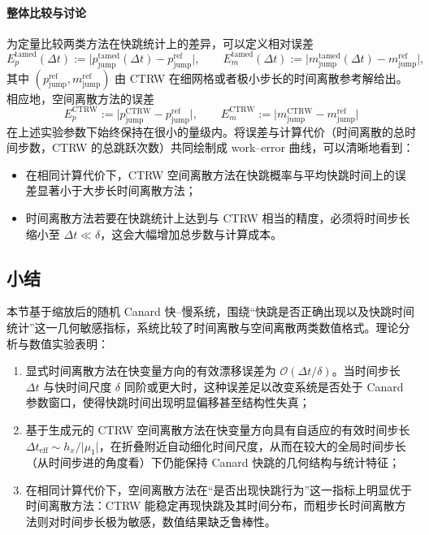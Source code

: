 \paragraph{整体比较与讨论}

为定量比较两类方法在快跳统计上的差异，可以定义相对误差
\[
E_p^{\mathrm{tamed}}(\Delta t)
:= \bigl\lvert p_{\mathrm{jump}}^{\mathrm{tamed}}(\Delta t)
- p_{\mathrm{jump}}^{\mathrm{ref}}\bigr\rvert,\qquad
E_m^{\mathrm{tamed}}(\Delta t)
:= \bigl\lvert m_{\mathrm{jump}}^{\mathrm{tamed}}(\Delta t)
- m_{\mathrm{jump}}^{\mathrm{ref}}\bigr\rvert,
\]
其中 \((p_{\mathrm{jump}}^{\mathrm{ref}},m_{\mathrm{jump}}^{\mathrm{ref}})\) 由 CTRW 在细网格或者极小步长的时间离散参考解给出。相应地，空间离散方法的误差
\[
E_p^{\mathrm{CTRW}}
:= \bigl\lvert p_{\mathrm{jump}}^{\mathrm{CTRW}}
- p_{\mathrm{jump}}^{\mathrm{ref}}\bigr\rvert,\qquad
E_m^{\mathrm{CTRW}}
:= \bigl\lvert m_{\mathrm{jump}}^{\mathrm{CTRW}}
- m_{\mathrm{jump}}^{\mathrm{ref}}\bigr\rvert
\]
在上述实验参数下始终保持在很小的量级内。将误差与计算代价（时间离散的总时间步数，CTRW 的总跳跃次数）共同绘制成 work--error 曲线，可以清晰地看到：

\begin{itemize}
	\item 在相同计算代价下，CTRW 空间离散方法在快跳概率与平均快跳时间上的误差显著小于大步长时间离散方法；
	\item 时间离散方法若要在快跳统计上达到与 CTRW 相当的精度，必须将时间步长缩小至 \(\Delta t\ll\delta\)，这会大幅增加总步数与计算成本。
\end{itemize}

\subsection{小结}

本节基于缩放后的随机 Canard 快--慢系统，围绕“快跳是否正确出现以及快跳时间统计”这一几何敏感指标，系统比较了时间离散与空间离散两类数值格式。理论分析与数值实验表明：

\begin{enumerate}
	\item 显式时间离散方法在快变量方向的有效漂移误差为 \(\mathcal O(\Delta t/\delta)\)。当时间步长 \(\Delta t\) 与快时间尺度 \(\delta\) 同阶或更大时，这种误差足以改变系统是否处于 Canard 参数窗口，使得快跳时间出现明显偏移甚至结构性失真；
	\item 基于生成元的 CTRW 空间离散方法在快变量方向具有自适应的有效时间步长 \(\Delta t_{\mathrm{eff}}\sim h_x/\lvert\mu_1\rvert\)，在折叠附近自动细化时间尺度，从而在较大的全局时间步长（从时间步进的角度看）下仍能保持 Canard 快跳的几何结构与统计特征；
	\item 在相同计算代价下，空间离散方法在“是否出现快跳行为”这一指标上明显优于时间离散方法：CTRW 能稳定再现快跳及其时间分布，而粗步长时间离散方法则对时间步长极为敏感，数值结果缺乏鲁棒性。
\end{enumerate}


